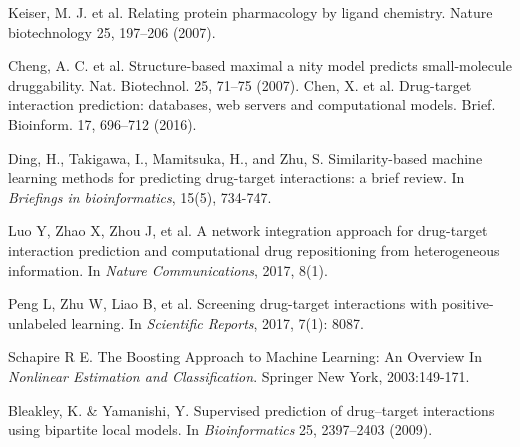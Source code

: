 \documentclass[journal]{IEEEtran}
\begin{document}
%
%
%
\begin{thebibliography}{10}

Keiser, M. J. et al. Relating protein pharmacology by ligand chemistry. Nature biotechnology 25, 197–206 (2007).

Cheng, A. C. et al. Structure-based maximal a nity model predicts small-molecule druggability. Nat. Biotechnol. 25, 71–75 (2007).
Chen, X. et al. Drug-target interaction prediction: databases, web servers and computational models. Brief. Bioinform. 17, 696–712 (2016).

Ding, H., Takigawa, I., Mamitsuka, H., and Zhu, S.
\newblock Similarity-based machine learning methods for predicting drug-target interactions: a brief review. \newblock In {\em Briefings in bioinformatics}, 15(5), 734-747.



Luo Y, Zhao X, Zhou J, et al.
\newblock A network integration approach for drug-target interaction prediction and computational drug repositioning from heterogeneous information.
\newblock In {\em Nature Communications}, 2017, 8(1).



Peng L, Zhu W, Liao B, et al.
\newblock Screening drug-target interactions with positive-unlabeled learning.
\newblock In {\em Scientific Reports}, 2017, 7(1): 8087.


Schapire R E. 
\newblock The Boosting Approach to Machine Learning: An Overview
\newblock In {\em Nonlinear Estimation and Classification}. Springer New York, 2003:149-171.



Bleakley, K. & Yamanishi, Y. 
\newblock Supervised prediction of drug–target interactions using bipartite local models. 
\newblock In {\em Bioinformatics} 25, 2397–2403 (2009).



\end{thebibliography}
\end{document}
